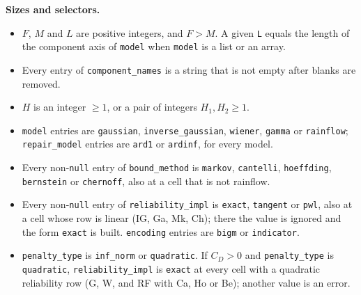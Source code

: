 \textbf{Sizes and selectors.}
\begin{itemize}[leftmargin=1.5em]
  \item $F$, $M$ and $L$ are positive integers, and $F > M$. A given \texttt{L} equals the length of the component axis of \texttt{model} when \texttt{model} is a list or an array.
  \item Every entry of \texttt{component\_names} is a string that is not empty after blanks are removed.
  \item $H$ is an integer $\ge 1$, or a pair of integers $H_1, H_2 \ge 1$.
  \item \texttt{model} entries are \texttt{gaussian}, \texttt{inverse\_gaussian}, \texttt{wiener}, \texttt{gamma} or \texttt{rainflow}; \texttt{repair\_model} entries are \texttt{ard1} or \texttt{ardinf}, for every model.
  \item Every non-\texttt{null} entry of \texttt{bound\_method} is \texttt{markov}, \texttt{cantelli}, \texttt{hoeffding}, \texttt{bernstein} or \texttt{chernoff}, also at a cell that is not rainflow.
  \item Every non-\texttt{null} entry of \texttt{reliability\_impl} is \texttt{exact}, \texttt{tangent} or \texttt{pwl}, also at a cell whose row is linear (IG, Ga, Mk, Ch); there the value is ignored and the form \texttt{exact} is built. \texttt{encoding} entries are \texttt{bigm} or \texttt{indicator}.
  \item \texttt{penalty\_type} is \texttt{inf\_norm} or \texttt{quadratic}. If $C_D > 0$ and \texttt{penalty\_type} is \texttt{quadratic}, \texttt{reliability\_impl} is \texttt{exact} at every cell with a quadratic reliability row (G, W, and RF with Ca, Ho or Be); another value is an error.
\end{itemize}

